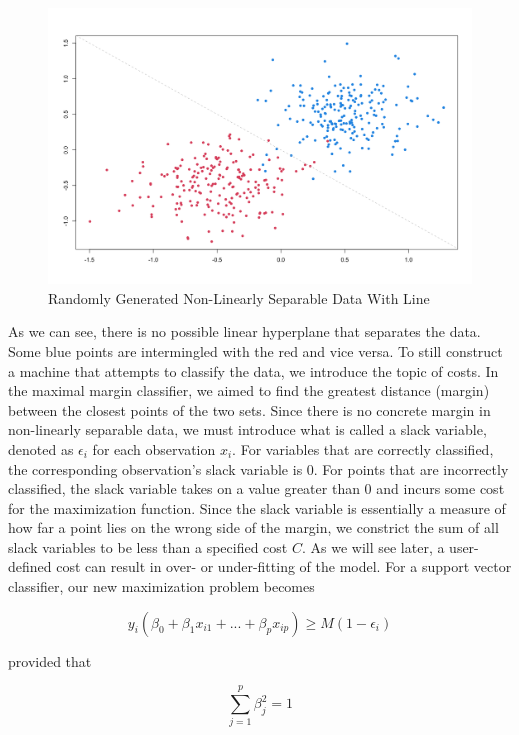 \documentclass[12pt]{article}
\begin{document}
\begin{figure}
    \centering
    \includegraphics[width=5in]{Figures/svc_randomly_generated_w_line.png}
    \caption{Randomly Generated Non-Linearly Separable Data With Line}
    \label{fig_svc_randomly_generated_w_line}
\end{figure}

As we can see, there is no possible linear hyperplane that separates the data. Some blue points are intermingled with the red and vice versa. To still construct a machine that attempts to classify the data, we introduce the topic of costs. In the maximal margin classifier, we aimed to find the greatest distance (margin) between the closest points of the two sets. Since there is no concrete margin in non-linearly separable data, we must introduce what is called a slack variable, denoted as $\epsilon_i$ for each observation $x_i$. For variables that are correctly classified, the corresponding observation's slack variable is 0. For points that are incorrectly classified, the slack variable takes on a value greater than 0 and incurs some cost for the maximization function. Since the slack variable is essentially a measure of how far a point lies on the wrong side of the margin, we constrict the sum of all slack variables to be less than a specified cost $C$. As we will see later, a user-defined cost can result in over- or under-fitting of the model. For a support vector classifier, our new maximization problem becomes

\[
y_i(\beta_0+\beta_1x_{i1}+...+\beta_px_{ip}) \ge M(1-\epsilon_i)
\]

provided that

\begin{equation}\label{sumofsquares}
\sum_{j=1}^{p} \beta^2_j=1
\end{equation}
\end{document}
